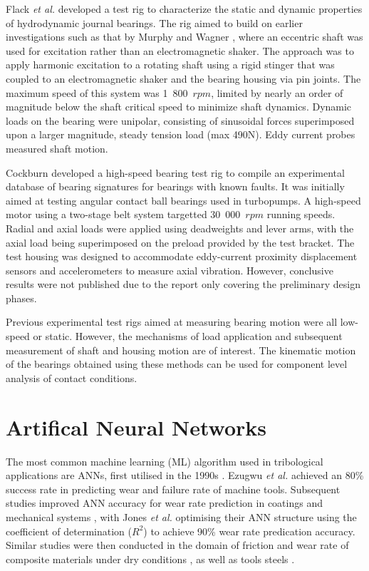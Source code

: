 Flack \textit{et al.} \cite{Flack1993a} developed a test rig to characterize the static and dynamic properties of hydrodynamic journal bearings. The rig aimed to build on earlier investigations such as that by Murphy and Wagner \cite{Murphy1991} , where an eccentric shaft was used for excitation rather than an electromagnetic shaker. The approach was to apply harmonic excitation to a rotating shaft using a rigid stinger that was coupled to an electromagnetic shaker and the bearing housing via pin joints. The maximum speed of this system was 1~800~$rpm$, limited by nearly an order of magnitude below the shaft critical speed to minimize shaft dynamics. Dynamic loads on the bearing were unipolar, consisting of sinusoidal forces superimposed upon a larger magnitude, steady tension load (max 490N). Eddy current probes measured shaft motion.

Cockburn \cite{Cockburn1995a} developed a high-speed bearing test rig to compile an experimental database of bearing signatures for bearings with known faults. It was initially aimed at testing angular contact ball bearings used in turbopumps. A high-speed motor using a two-stage belt system targetted 30~000~$rpm$ running speeds. Radial and axial loads were applied using deadweights and lever arms, with the axial load being superimposed on the preload provided by the test bracket. The test housing was designed to accommodate eddy-current proximity displacement sensors and accelerometers to measure axial vibration. However, conclusive results were not published due to the report only covering the preliminary design phases.

Previous experimental test rigs aimed at measuring bearing motion were all low-speed or static. However, the mechanisms of load application and subsequent measurement of shaft and housing motion are of interest. The kinematic motion of the bearings obtained using these methods can be used for component level analysis of contact conditions.

\section{Artifical Neural Networks}

The most common machine learning (ML) algorithm used in tribological applications are ANNs, first utilised in the 1990s \cite{Argatov2019}. Ezugwu \textit{et al.} \cite{Ezugwu1995} achieved an 80\% success rate in predicting wear and failure rate of machine tools. Subsequent studies improved ANN accuracy for wear rate prediction in coatings \cite{Rutherford1996} and mechanical systems \cite{Jones1997}, with Jones \textit{et al.} optimising their ANN structure using the coefficient of determination ($R^2$) to achieve 90\% wear rate predication accuracy. Similar studies were then conducted in the domain of friction and wear rate of composite materials under dry conditions \cite{Zhang2002} \cite{Genel2003} \cite{Hayajneh2009}, as well as tools steels \cite{Cavaleri2019}. 

